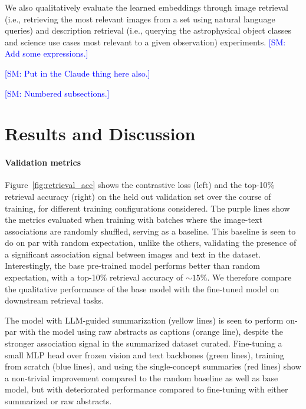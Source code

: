 \documentclass[10pt]{article} %
\newcommand{\SM}[1]{\textcolor{blue}{[SM: #1]}}
\begin{document}
We also qualitatively evaluate the learned embeddings through image retrieval (i.e., retrieving the most relevant images from a set using natural language queries) and description retrieval (i.e., querying the astrophysical object classes and science use cases most relevant to a given observation) experiments. \SM{Add some expressions.}

\SM{Put in the Claude thing here also.}

\SM{Numbered subsections.}

\section{Results and Discussion}
\label{sec:results}

\paragraph*{Validation metrics}

Figure~\ref{fig:retrieval_acc} shows the contrastive loss (left) and the top-10\% retrieval accuracy (right) on the held out validation set over the course of training, for different training configurations considered.
%
The purple lines show the metrics evaluated when training with batches where the image-text associations are randomly shuffled, serving as a baseline.
%
This baseline is seen to do on par with random expectation, unlike the others, validating the presence of a significant association signal between images and text in the dataset.
%
Interestingly, the base pre-trained model performs better than random expectation, with a top-10\% retrieval accuracy of $\sim 15\%$.
%
We therefore compare the qualitative performance of the base model with the fine-tuned model on downstream retrieval tasks.

The model with LLM-guided summarization (yellow lines) is seen to perform on-par with the model using raw abstracts as captions (orange line), despite the stronger association signal in the summarized dataset curated.
%
Fine-tuning a small MLP head over frozen vision and text backbones (green lines), training from scratch (blue lines), and using the single-concept summaries (red lines) show a non-trivial improvement compared to the random baseline as well as base model, but with deteriorated performance compared to fine-tuning with either summarized or raw abstracts.
\end{document}
